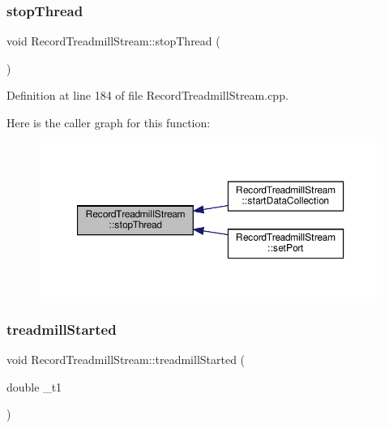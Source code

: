\subsubsection{\texorpdfstring{stop\+Thread}{stopThread}}
{\footnotesize\ttfamily void Record\+Treadmill\+Stream\+::stop\+Thread (\begin{DoxyParamCaption}{ }\end{DoxyParamCaption})\hspace{0.3cm}{\ttfamily [slot]}}



Definition at line 184 of file Record\+Treadmill\+Stream.\+cpp.

Here is the caller graph for this function\+:
\nopagebreak
\begin{figure}[H]
\begin{center}
\leavevmode
\includegraphics[width=350pt]{class_record_treadmill_stream_a4ab55dd8bf6498780d3fc92a6ae545f1_icgraph}
\end{center}
\end{figure}
\mbox{\label{class_record_treadmill_stream_afa610ced919405446a8bd28910a9a65e}} 
\subsubsection{\texorpdfstring{treadmill\+Started}{treadmillStarted}}
{\footnotesize\ttfamily void Record\+Treadmill\+Stream\+::treadmill\+Started (\begin{DoxyParamCaption}\item[{double}]{\+\_\+t1 }\end{DoxyParamCaption})\hspace{0.3cm}{\ttfamily [signal]}}



